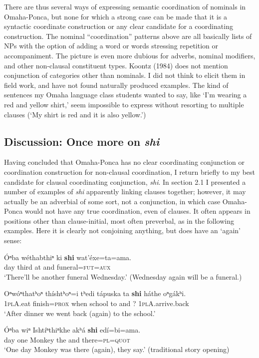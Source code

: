 \documentclass[output=paper]{LSP/langsci}
\begin{document}
There are thus several ways of expressing semantic coordination of nominals in Omaha-Ponca, but none for which a strong case can be made that it is a syntactic coordinate construction or any clear candidate for a coordinating construction. The nominal ``coordination'' patterns above are all basically lists of NPs with the option of adding a word or words stressing repetition or accompaniment. The picture is even more dubious for adverbs, nominal modifiers, and other non-clausal constituent types. Koontz (1984) does not mention conjunction of categories other than nominals. I did not think to elicit them in field work, and have not found naturally produced examples.  The kind of sentences my Omaha language class students wanted to say, like `I'm wearing a red and yellow shirt,' seem impossible to express without resorting to multiple clauses (`My shirt is red and it is also yellow.')

\subsection{Discussion: Once more on \textit{shi}}

Having concluded that Omaha-Ponca has no clear coordinating conjunction or coordination construction for non-clausal coordination, I return briefly to my best candidate for clausal coordinating conjunction, \textit{shi}. In section 2.1 I presented a number of examples of \textit{shi} apparently linking clauses together; however, it may actually be an adverbial of some sort, not a conjunction, in which case Omaha-Ponca would not have any true coordination, even of clauses. It often appears in positions other than clause-initial, most often preverbal, as in the following examples. Here it is clearly not conjoining anything, but does have an `again' sense:  

\begin{exe}	
\ex
\gll \'Oⁿba 	w\'ethabthiⁿ 	ki 	\textbf{shi}  	wat'\'exe=ta=ama.  \\
day  	third          	at 	and 	funeral=\textsc{fut=aux}  \\
\trans `There'll be another funeral Wednesday.'   (Wednesday again will be a funeral.)

\ex 
\gll Oⁿw\'oⁿthatʰoⁿ th\'ishtʰoⁿ=i 	tʰedi 	t\'apuska 	ta 	\textbf{shi}  h\'athe 	oⁿg\'akʰi. \\
\textsc{1plA}.eat  	finish=\textsc{prox} 	when 	school 	to 	and ?  	\textsc{1plA}.arrive.back \\
\trans `After dinner we went back (again) to the school.'

\ex
\gll \'Oⁿba 	wiⁿ 	Isht\'iⁿthiⁿkhe 	akʰ\'a \textbf{shi} ed\'i=bi=ama. \\
day	one 	Monkey 	the 	and 	there=\textsc{pl=quot} \\
\trans `One day Monkey was there (again), they say.'  (traditional story opening)
\end{exe}
\end{document}
